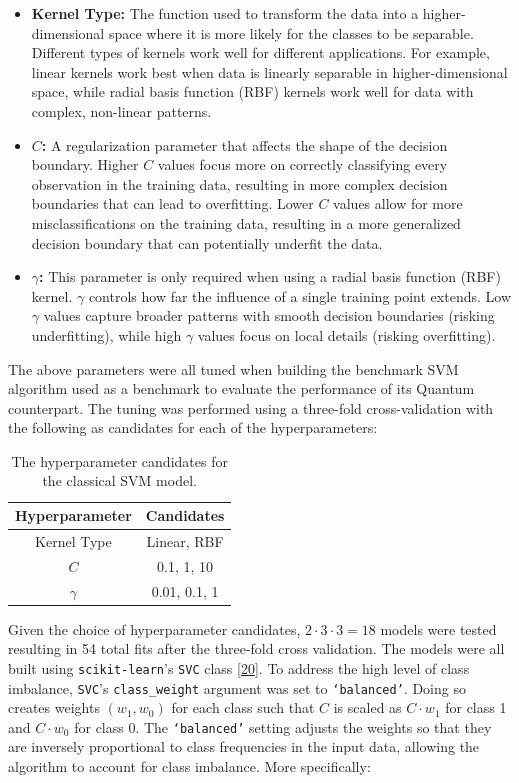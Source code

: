 \documentclass[11pt, oneside]{article}   	%
\begin{document}
\begin{itemize}
    \item \textbf{Kernel Type:} The function used to transform the data into a higher-dimensional space where it is more likely for the classes to be separable. Different types of kernels work well for different applications. For example, linear kernels work best when data is linearly separable in higher-dimensional space, while radial basis function (RBF) kernels work well for data with complex, non-linear patterns.
    \item \textbf{$C$:} A regularization parameter that affects the shape of the decision boundary. Higher $C$ values focus more on correctly classifying every observation in the training data, resulting in more complex decision boundaries that can lead to overfitting. Lower $C$ values allow for more misclassifications on the training data, resulting in a more generalized decision boundary that can potentially underfit the data.
    \item \textbf{$\gamma$:} This parameter is only required when using a radial basis function (RBF) kernel. $\gamma$ controls how far the influence of a single training point extends. Low $\gamma$ values capture broader patterns with smooth decision boundaries (risking underfitting), while high $\gamma$ values focus on local details (risking overfitting).
\end{itemize}

The above parameters were all tuned when building the benchmark SVM algorithm used as a benchmark to evaluate the performance of its Quantum counterpart. The tuning was performed using a three-fold cross-validation with the following as candidates for each of the hyperparameters:

\begin{table}[h!]
    \centering
    \begin{tabular}{|c|c|}
        \hline
        \textbf{Hyperparameter} & \textbf{Candidates} \\ \hline
        Kernel Type & Linear, RBF \\ \hline
        $C$  & 0.1, 1, 10 \\ \hline
        $\gamma$ & 0.01, 0.1, 1 \\ \hline
    \end{tabular}
    \caption{The hyperparameter candidates for the classical SVM model.}
    \label{tab1}
\end{table}

Given the choice of hyperparameter candidates, $2 \cdot 3 \cdot 3 = 18$ models were tested resulting in 54 total fits after the three-fold cross validation. The models were all built using \texttt{scikit-learn}'s \texttt{SVC} class [\href{https://www.nature.com/articles/s41592-019-0686-2}{20}]. To address the high level of class imbalance, \texttt{SVC}'s \texttt{class\_weight} argument was set to \texttt{`balanced'}. Doing so creates weights $(w_1, w_0)$ for each class such that $C$ is scaled as $C \cdot w_1$ for class 1 and $C \cdot w_0$ for class 0. The \texttt{`balanced'} setting adjusts the weights so that they are inversely proportional to class frequencies in the input data, allowing the algorithm to account for class imbalance. More specifically:
\end{document}
